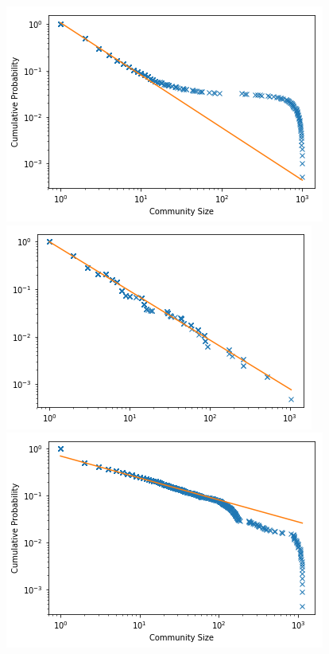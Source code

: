\documentclass[12pt,twoside]{report}
\begin{document}
\begin{figure}[H]
\begin{center}
\begin{minipage}{0.45\linewidth}
\includegraphics[width=\linewidth]{figures/er_curve.png}
\end{minipage}%
\hfill
\begin{minipage}{0.45\linewidth}
\includegraphics[width=\linewidth]{figures/fractal_curve.png}
\end{minipage}%
\hfill
\begin{minipage}{0.45\linewidth}
\includegraphics[width=\linewidth]{figures/uvl_curve.png}

\end{minipage}
\end{center}
\end{figure}
\end{document}
